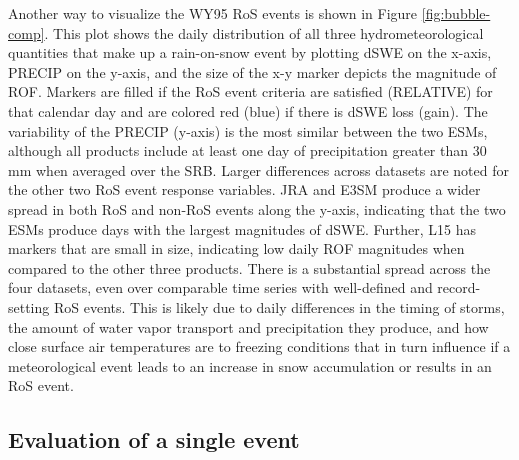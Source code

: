 \documentclass[nhess, manuscript]{copernicus}
\begin{document}
Another way to visualize the WY95 RoS events is shown in Figure \ref{fig:bubble-comp}.
This plot shows the daily distribution of all three hydrometeorological quantities that make up a rain-on-snow event by plotting dSWE on the x-axis, PRECIP on the y-axis, and the size of the x-y marker depicts the magnitude of ROF.
Markers are filled if the RoS event criteria are satisfied (RELATIVE) for that calendar day and are colored red (blue) if there is dSWE loss (gain).
The variability of the PRECIP (y-axis) is the most similar between the two ESMs, although all products include at least one day of precipitation greater than 30 mm when averaged over the SRB.
Larger differences across datasets are noted for the other two RoS event response variables.
JRA and E3SM produce a wider spread in both RoS and non-RoS events along the y-axis, indicating that the two ESMs produce days with the largest magnitudes of dSWE.
Further, L15 has markers that are small in size, indicating low daily ROF magnitudes when compared to the other three products.
There is a substantial spread across the four datasets, even over comparable time series with well-defined and record-setting RoS events.
This is likely due to daily differences in the timing of storms, the amount of water vapor transport and precipitation they produce, and how close surface air temperatures are to freezing conditions that in turn influence if a meteorological event leads to an increase in snow accumulation or results in an RoS event.

\subsection{Evaluation of a single event}


\end{document}
